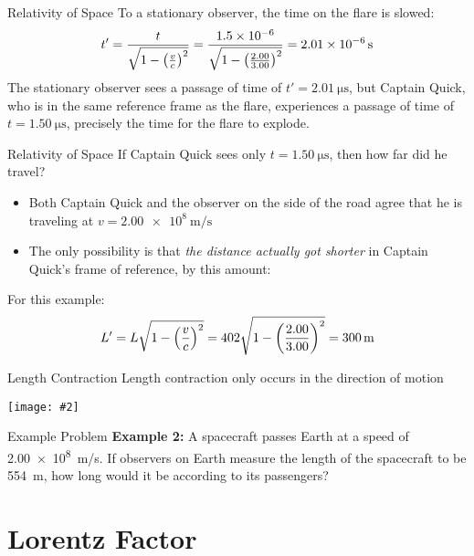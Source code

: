 \documentclass[12pt,compress,aspectratio=169]{beamer}
\newcommand{\pic}[2]{\texttt{[image: \#2]}}
\newcommand{\bigsqrt}{\ensuremath\sqrt{1-\left(\frac{v}{c}\right)^2}}
\newcommand{\eq}[2]{\vspace{#1}{\Large\begin{displaymath}#2\end{displaymath}}}
\begin{document}
\begin{frame}{Relativity of Space}
  To a stationary observer, the time on the flare is slowed:
  \begin{displaymath}
    t'
    = \frac{t}{\bigsqrt}
    = \frac{\num{1.5e-6}}{\sqrt{1-\left(\frac{2.00}{3.00}\right)^2}}
    = \SI{2.01e-6}{\second}
  \end{displaymath}
  The stationary observer sees a passage of time of
  $t'=\SI{2.01}{\micro\second}$, but Captain Quick, who is in the same
  reference frame as the flare, experiences a passage of time of
  $t=\SI{1.50}{\micro\second}$, precisely the time for the flare to explode.
\end{frame}


\begin{frame}{Relativity of Space}
  If Captain Quick sees only $t=\SI{1.50}{\micro\second}$, then how far did he
  travel?
  \begin{itemize}
  \item Both Captain Quick and the observer on the side of the road agree that
    he is traveling at $v=\SI{2.00e8}{\metre\per\second}$
  \item The only possibility is that \emph{the distance actually got shorter}
    in Captain Quick's frame of reference, by this amount:
    
    \eq{-.2in}{
      \boxed{L'=L\bigsqrt}
    }
  \end{itemize}
  For this example:
  \begin{displaymath}
    L'=L\bigsqrt=402\sqrt{1-\left(\frac{2.00}{3.00}\right)^2}=\SI{300}{\metre}
  \end{displaymath}
\end{frame}


\begin{frame}{Length Contraction}
  Length contraction only occurs in the direction of motion
  \begin{center}
    \pic{.8}{graphics/baseball-contraction}
    \end{center}
\end{frame}

\begin{frame}{Example Problem}
  \textbf{Example 2:} A spacecraft passes Earth at a speed of \SI{2.00e8}{m/s}.
  If observers on Earth measure the length of the spacecraft to be
  \SI{554}{\metre}, how long would it be according to its passengers?
\end{frame}


\section{Lorentz Factor}
\end{document}
